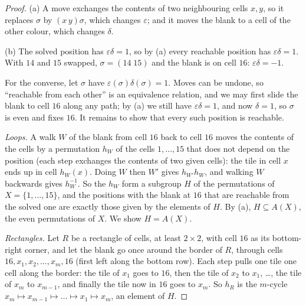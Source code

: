 \begin{proof}
(a) A move exchanges the contents of two neighbouring cells $x,y$, so it replaces $\sigma$ by $(x\,y)\sigma$, which changes $\varepsilon$; and it moves the blank to a cell of the other colour, which changes $\delta$.

(b) The solved position has $\varepsilon\delta=1$, so by (a) every reachable position has $\varepsilon\delta=1$. With $14$ and $15$ swapped, $\sigma=(14\;15)$ and the blank is on cell $16$: $\varepsilon\delta=-1$.

For the converse, let $\sigma$ have $\varepsilon(\sigma)\delta(\sigma)=1$. Moves can be undone, so ``reachable from each other'' is an equivalence relation, and we may first slide the blank to cell $16$ along any path; by (a) we still have $\varepsilon\delta=1$, and now $\delta=1$, so $\sigma$ is even and fixes $16$. It remains to show that every such position is reachable.

\emph{Loops.} A walk $W$ of the blank from cell $16$ back to cell $16$ moves the contents of the cells by a permutation $h_W$ of the cells $1,\dots,15$ that does not depend on the position (each step exchanges the contents of two given cells): the tile in cell $x$ ends up in cell $h_W(x)$. Doing $W$ then $W'$ gives $h_{W'}h_W$, and walking $W$ backwards gives $h_W^{-1}$. So the $h_W$ form a subgroup $H$ of the permutations of $X=\{1,\dots,15\}$, and the positions with the blank at $16$ that are reachable from the solved one are exactly those given by the elements of $H$. By (a), $H\subseteq A(X)$, the even permutations of $X$. We show $H=A(X)$.

\emph{Rectangles.} Let $R$ be a rectangle of cells, at least $2\times2$, with cell $16$ as its bottom-right corner, and let the blank go once around the border of $R$, through cells $16,x_1,x_2,\dots,x_m,16$ (first left along the bottom row). Each step pulls one tile one cell along the border: the tile of $x_1$ goes to $16$, then the tile of $x_2$ to $x_1$, \dots, the tile of $x_m$ to $x_{m-1}$, and finally the tile now in $16$ goes to $x_m$. So $h_R$ is the $m$-cycle $x_m\mapsto x_{m-1}\mapsto\dots\mapsto x_1\mapsto x_m$, an element of $H$.


\end{proof}
